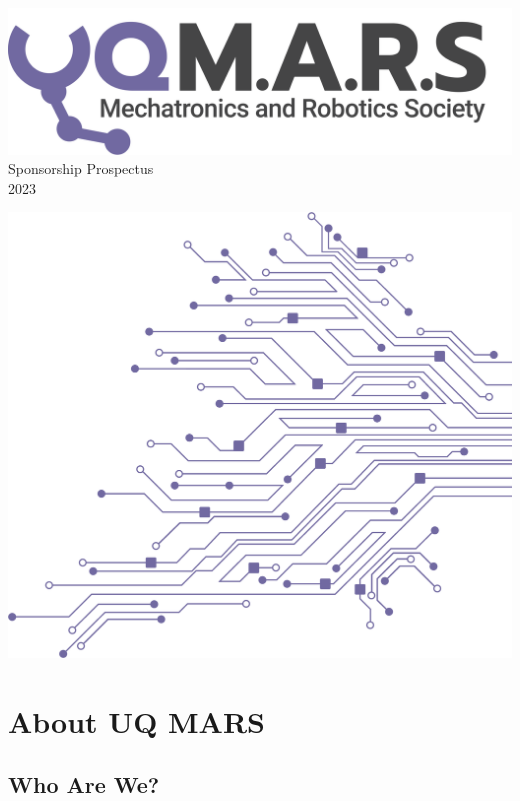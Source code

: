 \documentclass[a4paper,12pt]{report}
\begin{document}
\begin{titlepage}
    \begin{center}
        \vspace*{15mm}
        \includegraphics[width=0.7\paperwidth]{../assets/Logo (Dark).png} \\
        \vspace{1cm}
        \Huge Sponsorship Prospectus \\
        \huge \textcolor{turbo_purple}{2023}
    \end{center}
    \vfill
    \includegraphics[height=0.5\paperheight, right]{../assets/Pattern - PCB (Solid).png}
    \vspace*{10mm}
\end{titlepage}
\restoregeometry

\section*{About UQ MARS}
\subsection*{Who Are We?}
\end{document}
